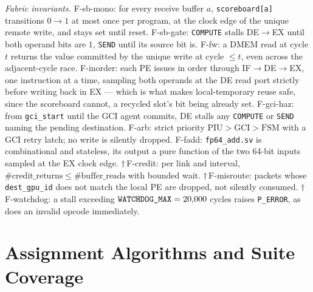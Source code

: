 \documentclass[journal,10pt]{IEEEtran}
\theoremstyle{plain}
\theoremstyle{definition}
\theoremstyle{remark}
\newcommand{\sv}[1]{\texttt{#1}}
\begin{document}
\emph{Fabric invariants.}
\textsf{F-sb-mono}: for every receive buffer $a$, \texttt{scoreboard[a]}
transitions $0\to1$ at most once per program, at the clock edge of the unique
remote write, and stays set until reset.
\textsf{F-sb-gate}: \texttt{COMPUTE} stalls \textsf{DE}$\to$\textsf{EX} until
both operand bits are $1$, \texttt{SEND} until its source bit is.
\textsf{F-fw}: a DMEM read at cycle $t$ returns the value committed by the
unique write at cycle $\leq t$, even across the adjacent-cycle race.
\textsf{F-inorder}: each PE issues in order through
\textsf{IF}$\to$\textsf{DE}$\to$\textsf{EX}, one instruction at a time,
sampling both operands at the \textsf{DE} read port strictly before writing
back in \textsf{EX} --- which is what makes local-temporary reuse safe, since
the scoreboard cannot, a recycled slot's bit being already set.
\textsf{F-gci-haz}: from \sv{gci\_start} until the GCI agent commits,
\textsf{DE} stalls any \texttt{COMPUTE} or \texttt{SEND} naming the pending
destination.
\textsf{F-arb}: strict priority $\mathrm{PIU} > \mathrm{GCI} > \mathrm{FSM}$
with a GCI retry latch; no write is silently dropped.
\textsf{F-fadd}: \sv{fp64\_add.sv} is combinational and stateless, its output
a pure function of the two 64-bit inputs sampled at the EX clock edge.
$\dagger$\,\textsf{F-credit}: per link and interval,
$\#\mathrm{credit\_returns} \leq \#\mathrm{buffer\_reads}$ with bounded wait.
$\dagger$\,\textsf{F-misroute}: packets whose \sv{dest\_gpu\_id} does not
match the local PE are dropped, not silently consumed.
$\dagger$\,\textsf{F-watchdog}: a stall exceeding
$\sv{WATCHDOG\_MAX} = \WatchdogMax$ cycles raises \texttt{P\_ERROR}, as does
an invalid opcode immediately.


\section{Assignment Algorithms and Suite Coverage}\label{app:algos}

\begin{table}[!t]
\caption{Assignment (S2) algorithms by family, with champion-class membership
  across the \TournNInst{} HW-validated instances --- the share of instances
  on which the algorithm produces a configuration whose measured cycle count
  equals the instance minimum. $\star$ marks the four members of the derived
  portfolio (\S\ref{main-sec:selrule}). Membership is invariant to the tie
  structure of \S\ref{main-sec:results-classes}; a win count is not, which is why
  this column replaces the winner shares of earlier versions.}
\label{tab:catalogue}
\centering
\footnotesize
\renewcommand{\arraystretch}{1.15}

\end{table}
\end{document}
